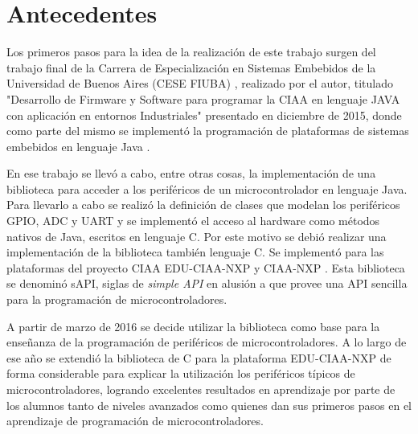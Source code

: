 \section{Antecedentes}
\label{sec:antecedentes}

Los primeros pasos para la idea de la realización de este trabajo surgen del trabajo final de la Carrera de Especialización en Sistemas Embebidos de la Universidad de Buenos Aires (CESE FIUBA) \cite{CESE}, realizado por el autor, titulado "Desarrollo de Firmware y Software para programar la CIAA en lenguaje JAVA con aplicación en entornos Industriales" \cite{CeseTesisEric} presentado en diciembre de 2015, donde como parte del mismo se implementó la programación de plataformas de sistemas embebidos en lenguaje Java \cite{Java}. 

En ese trabajo se llevó a cabo, entre otras cosas, la implementación de una biblioteca para acceder a los periféricos de un microcontrolador en lenguaje Java. Para llevarlo a cabo se realizó la definición de clases que modelan los periféricos GPIO, ADC y UART y se implementó el acceso al hardware como métodos nativos de Java, escritos en lenguaje C. Por este motivo se debió realizar una implementación de la biblioteca también lenguaje C. 
Se implementó para las plataformas del proyecto CIAA EDU-CIAA-NXP \cite{EDUCIAA} y CIAA-NXP \cite{CIAANXP}.
Esta biblioteca se denominó sAPI, siglas de \emph{simple API} en alusión a que provee una API sencilla para la programación de microcontroladores.


A partir de marzo de 2016 se decide utilizar la biblioteca como base para la enseñanza de la programación de periféricos de microcontroladores.
A lo largo de ese año se extendió la biblioteca de C para la plataforma EDU-CIAA-NXP de forma considerable para explicar la utilización los periféricos típicos de microcontroladores, logrando excelentes resultados en aprendizaje por parte de los alumnos tanto de niveles avanzados como quienes dan sus primeros pasos en el aprendizaje de programación de microcontroladores.

